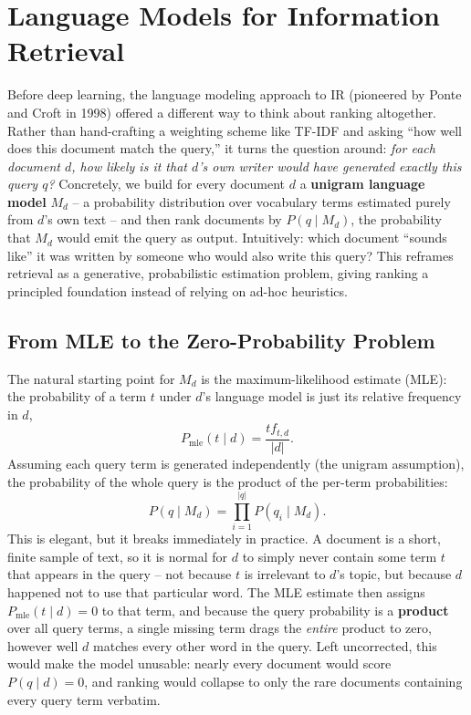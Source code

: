 \documentclass[11pt, a4paper]{article}
\begin{document}
\section{Language Models for Information Retrieval}

Before deep learning, the language modeling approach to IR (pioneered by Ponte and Croft in 1998) offered a different way to think about ranking altogether. Rather than hand-crafting a weighting scheme like TF-IDF and asking ``how well does this document match the query,'' it turns the question around: \emph{for each document $d$, how likely is it that $d$'s own writer would have generated exactly this query $q$?} Concretely, we build for every document $d$ a \textbf{unigram language model} $M_d$ -- a probability distribution over vocabulary terms estimated purely from $d$'s own text -- and then rank documents by $P(q\mid M_d)$, the probability that $M_d$ would emit the query as output. Intuitively: which document ``sounds like'' it was written by someone who would also write this query? This reframes retrieval as a generative, probabilistic estimation problem, giving ranking a principled foundation instead of relying on ad-hoc heuristics.

\subsection{From MLE to the Zero-Probability Problem}

The natural starting point for $M_d$ is the maximum-likelihood estimate (MLE): the probability of a term $t$ under $d$'s language model is just its relative frequency in $d$,
\[
P_{\text{mle}}(t \mid d) = \frac{tf_{t,d}}{|d|}.
\]
Assuming each query term is generated independently (the unigram assumption), the probability of the whole query is the product of the per-term probabilities:
\[
P(q \mid M_d) = \prod_{i=1}^{|q|} P(q_i \mid M_d).
\]
This is elegant, but it breaks immediately in practice. A document is a short, finite sample of text, so it is normal for $d$ to simply never contain some term $t$ that appears in the query -- not because $t$ is irrelevant to $d$'s topic, but because $d$ happened not to use that particular word. The MLE estimate then assigns $P_{\text{mle}}(t\mid d) = 0$ to that term, and because the query probability is a \textbf{product} over all query terms, a single missing term drags the \emph{entire} product to zero, however well $d$ matches every other word in the query. Left uncorrected, this would make the model unusable: nearly every document would score $P(q\mid d)=0$, and ranking would collapse to only the rare documents containing every query term verbatim.
\end{document}
